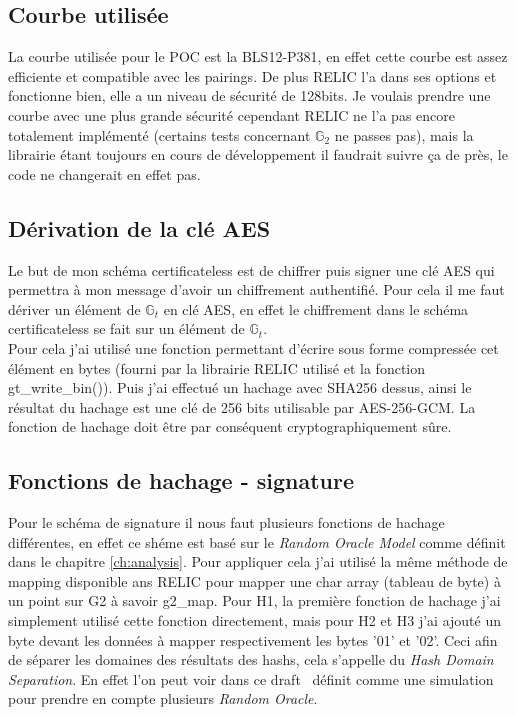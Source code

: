\subsection{Courbe utilisée}
La courbe utilisée pour le POC est la BLS12-P381, en effet cette courbe est assez efficiente et compatible avec les pairings. De plus RELIC l'a dans ses options et fonctionne bien, elle a un niveau de sécurité de 128bits. Je voulais prendre une courbe avec une plus grande sécurité cependant RELIC ne l'a pas encore totalement implémenté (certains tests concernant $\mathbb{G}_2$ ne passes pas), mais la librairie étant toujours en cours de développement il faudrait suivre ça de près, le code ne changerait en effet pas.
\subsection{Dérivation de la clé AES}
Le but de mon schéma certificateless est de chiffrer puis signer une clé AES qui permettra à mon message d'avoir un chiffrement authentifié. Pour cela il me faut dériver un élément de $\mathbb{G}_t$ en clé AES, en effet le chiffrement dans le schéma certificateless se fait sur un élément de $\mathbb{G}_t$.\\
Pour cela j'ai utilisé une fonction permettant d'écrire sous forme compressée cet élément en bytes (fourni par la librairie RELIC utilisé et la fonction gt\_write\_bin()). Puis j'ai effectué un hachage avec SHA256 dessus, ainsi le résultat du hachage est une clé de 256 bits utilisable par AES-256-GCM. La fonction de hachage doit être par conséquent cryptographiquement sûre.
\subsection{Fonctions de hachage - signature}
Pour le schéma de signature il nous faut plusieurs fonctions de hachage différentes, en effet ce shéme est basé sur le \textit{Random Oracle Model} comme définit dans le chapitre \ref{ch:analysis}. Pour appliquer cela j'ai utilisé la même méthode de mapping disponible ans RELIC pour mapper une char array (tableau de byte) à un point sur G2 à savoir g2\_map.
Pour H1, la première fonction de hachage j'ai simplement utilisé cette fonction directement, mais pour H2 et H3 j'ai ajouté un byte devant les données à mapper respectivement les bytes '01' et '02'. Ceci afin de séparer les domaines des résultats des hashs, cela s'appelle du \textit{Hash Domain Separation}. En effet l'on peut voir dans ce draft~\cite{irtf-cfrg-hash-to-curve} définit comme une simulation pour prendre en compte plusieurs \textit{Random Oracle}.
